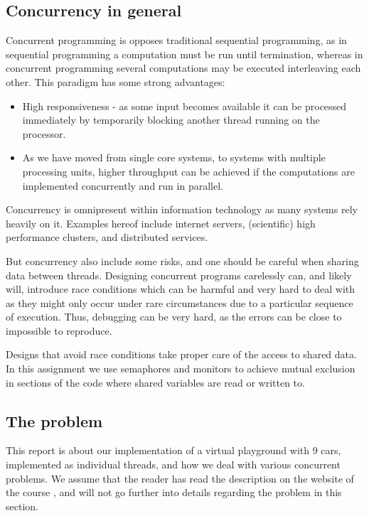 
\subsection{Concurrency in general}
Concurrent programming is opposes traditional sequential programming, as in sequential programming a computation must be run until termination, whereas in concurrent programming several computations may be executed interleaving each other. This paradigm has some strong advantages:
\begin{itemize}
	\item High responsiveness - as some input becomes available it can be processed immediately by temporarily blocking another thread running on the processor.
	\item As we have moved from single core systems, to systems with multiple processing units, higher throughput can be achieved if the computations are implemented concurrently and run in parallel.
\end{itemize}

Concurrency is omnipresent within information technology as many systems rely heavily on it. Examples hereof include  internet servers, (scientific) high performance clusters, and distributed services.

But concurrency also include some risks, and one should be careful when sharing data between threads. Designing concurrent programs carelessly can, and likely will, introduce race conditions which can be harmful and very hard to deal with as they might only occur under rare circumstances due to a particular sequence of execution. Thus, debugging can be very hard, as the errors can be close to impossible to reproduce.

Designs that avoid race conditions take proper care of the access to shared data. In this assignment we use semaphores and monitors to achieve mutual exclusion in sections of the code where shared variables are read or written to.


\subsection{The problem}
This report is about our implementation of a virtual playground with 9 cars, implemented as individual threads, and how we deal with various concurrent problems. We assume that the reader has read the description on the website of the course \cite{assignment}, and will not go further into details regarding the problem in this section.


